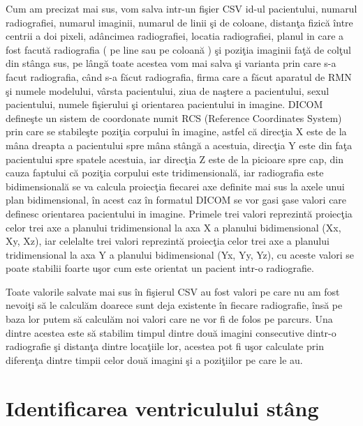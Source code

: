 Cum am precizat mai sus, vom salva intr-un fi\c{s}ier CSV id-ul pacientului, numarul radiografiei, numarul imaginii, numarul de linii \c{s}i de coloane, distan\c{t}a fizic\u{a} \^{i}ntre centrii a doi pixeli, ad\^{a}ncimea radiografiei, locatia radiografiei, planul in care a fost facut\u{a} radiografia ( pe line sau pe coloan\u{a} ) \c{s}i pozi\c{t}ia imaginii fa\c{t}\u{a} de col\c{t}ul din st\^{a}nga sus, pe l\^{a}ng\u{a} toate acestea vom mai salva \c{s}i varianta prin care s-a facut radiografia, c\^{a}nd s-a f\u{a}cut radiografia, firma care a f\u{a}cut aparatul de RMN \c{s}i numele modelului, v\^{a}rsta pacientului, ziua de na\c{s}tere a pacientului, sexul pacientului, numele fi\c{s}ierului \c{s}i orientarea pacientului in imagine. DICOM define\c{s}te un sistem de coordonate numit RCS (Reference Coordinates System) prin care se stabile\c{s}te pozi\c{t}ia corpului  \^{i}n imagine, astfel c\u{a} direc\c{t}ia X este de la m\^{a}na dreapta a pacientului spre m\^{a}na st\^{a}ng\u{a} a acestuia, direc\c{t}ia Y este din fa\c{t}a pacientului spre spatele acestuia, iar direc\c{t}ia Z este de la picioare spre cap, din cauza faptului c\u{a} pozi\c{t}ia corpului este tridimensional\u{a}, iar radiografia este bidimensional\u{a} se va calcula proiec\c{t}ia fiecarei axe definite mai sus la axele unui plan bidimensional, \^{i}n acest caz \^{i}n formatul DICOM se vor gasi \c{s}ase valori care definesc orientarea pacientului in imagine. Primele trei valori reprezint\u{a} proiec\c{t}ia celor trei axe a planului tridimensional la axa X a planului bidimensional (Xx, Xy, Xz), iar celelalte trei valori reprezint\u{a} proiec\c{t}ia celor trei axe a planului tridimensional la axa Y a planului bidimensional (Yx, Yy, Yz), cu aceste valori se poate stabilii foarte u\c{s}or cum este orientat un pacient intr-o radiografie.

\par

Toate valorile salvate mai sus \^{i}n fi\c{s}ierul CSV au fost valori pe care nu am fost nevoi\c{t}i s\u{a} le calcul\u{a}m doarece sunt deja existente \^{i}n fiecare radiografie, \^{i}ns\u{a} pe baza lor putem s\u{a} calcul\u{a}m noi valori care ne vor fi de folos pe parcurs. Una dintre acestea este s\u{a} stabilim timpul dintre dou\u{a} imagini consecutive dintr-o radiografie \c{s}i distan\c{t}a dintre loca\c{t}iile lor, acestea pot fi u\c{s}or calculate prin diferen\c{t}a dintre timpii  celor dou\u{a} imagini \c{s}i a pozi\c{t}iilor pe care le au.

\section{Identificarea ventriculului st\^{a}ng}

